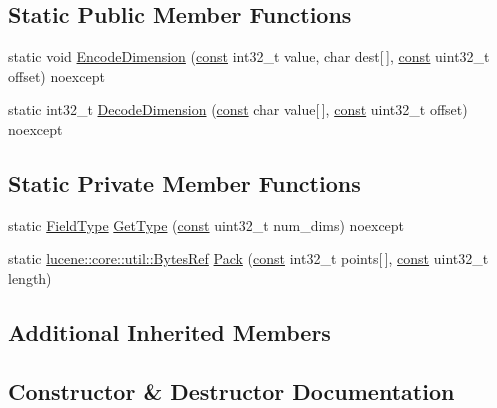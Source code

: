 \subsection*{Static Public Member Functions}
\begin{DoxyCompactItemize}
\item 
static void \mbox{\hyperlink{classlucene_1_1core_1_1document_1_1IntPoint_a44c8e743c679988d9a8d42c353735d28}{Encode\+Dimension}} (\mbox{\hyperlink{ZlibCrc32_8h_a2c212835823e3c54a8ab6d95c652660e}{const}} int32\+\_\+t value, char dest\mbox{[}$\,$\mbox{]}, \mbox{\hyperlink{ZlibCrc32_8h_a2c212835823e3c54a8ab6d95c652660e}{const}} uint32\+\_\+t offset) noexcept
\item 
static int32\+\_\+t \mbox{\hyperlink{classlucene_1_1core_1_1document_1_1IntPoint_a29eaf7c0c579e416100f0cb16e622de7}{Decode\+Dimension}} (\mbox{\hyperlink{ZlibCrc32_8h_a2c212835823e3c54a8ab6d95c652660e}{const}} char value\mbox{[}$\,$\mbox{]}, \mbox{\hyperlink{ZlibCrc32_8h_a2c212835823e3c54a8ab6d95c652660e}{const}} uint32\+\_\+t offset) noexcept
\end{DoxyCompactItemize}
\subsection*{Static Private Member Functions}
\begin{DoxyCompactItemize}
\item 
static \mbox{\hyperlink{classlucene_1_1core_1_1document_1_1FieldType}{Field\+Type}} \mbox{\hyperlink{classlucene_1_1core_1_1document_1_1IntPoint_aea4e98fc61985c22e12bf248d1c4a1bc}{Get\+Type}} (\mbox{\hyperlink{ZlibCrc32_8h_a2c212835823e3c54a8ab6d95c652660e}{const}} uint32\+\_\+t num\+\_\+dims) noexcept
\item 
static \mbox{\hyperlink{classlucene_1_1core_1_1util_1_1BytesRef}{lucene\+::core\+::util\+::\+Bytes\+Ref}} \mbox{\hyperlink{classlucene_1_1core_1_1document_1_1IntPoint_ab72dd15b82e4c9807910db3b2ac3a737}{Pack}} (\mbox{\hyperlink{ZlibCrc32_8h_a2c212835823e3c54a8ab6d95c652660e}{const}} int32\+\_\+t points\mbox{[}$\,$\mbox{]}, \mbox{\hyperlink{ZlibCrc32_8h_a2c212835823e3c54a8ab6d95c652660e}{const}} uint32\+\_\+t length)
\end{DoxyCompactItemize}
\subsection*{Additional Inherited Members}


\subsection{Constructor \& Destructor Documentation}
\mbox{\label{classlucene_1_1core_1_1document_1_1IntPoint_aa133857ccc70fbb2b8933d5ecaa46fb5}} 
